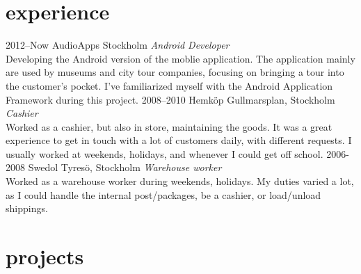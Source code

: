 \documentclass['print']{friggeri-cv} %
\begin{document}

\section{experience}

\begin{entrylist}
\entry
{2012--Now}
{AudioApps}
{Stockholm}
{\emph{Android Developer} \\
Developing the Android version of the moblie application. The application mainly are used by museums and city tour companies, focusing on bringing a tour into the customer's pocket. I've familiarized myself with the Android Application Framework during this project.}
\entry
{2008--2010}
{Hemköp}
{Gullmarsplan, Stockholm}
{\emph{Cashier} \\
Worked as a cashier, but also in store, maintaining the goods. It was a great experience to get in touch with a lot of customers daily, with different requests. I usually worked at weekends, holidays, and whenever I could get off school.}
\entry
{2006-2008}
{Swedol}
{Tyresö, Stockholm}
{\emph{Warehouse worker} \\
Worked as a warehouse worker during weekends, holidays. My duties varied a lot, as I could handle the internal post/packages, be a cashier, or load/unload shippings.}
\end{entrylist}

\clearpage


\section{projects}
\end{document}
